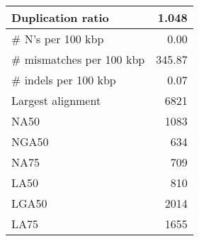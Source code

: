 \documentclass[12pt,a4paper]{article}
\begin{document}
\begin{table}[ht]
\begin{center}
\begin{tabular}{|l*{1}{|r}|}
Duplication ratio & 1.048 \\ \hline
\# N's per 100 kbp & 0.00 \\ \hline
\# mismatches per 100 kbp & 345.87 \\ \hline
\# indels per 100 kbp & 0.07 \\ \hline
Largest alignment & 6821 \\ \hline
NA50 & 1083 \\ \hline
NGA50 & 634 \\ \hline
NA75 & 709 \\ \hline
LA50 & 810 \\ \hline
LGA50 & 2014 \\ \hline
LA75 & 1655 \\ \hline
\end{tabular}
\end{center}
\end{table}
\end{document}
